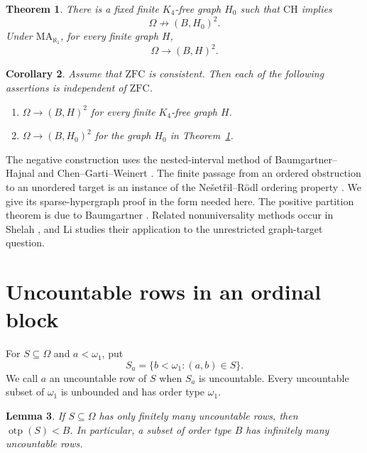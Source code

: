 \documentclass[10pt,letterpaper,leqno]{amsart}
\numberwithin{equation}{section}
\newtheorem{theorem}{Theorem}[section]
\newtheorem{lemma}[theorem]{Lemma}
\newtheorem{corollary}[theorem]{Corollary}
\theoremstyle{definition}
\theoremstyle{remark}
\newcommand{\MA}{\mathrm{MA}_{\aleph_1}}
\newcommand{\CH}{\mathrm{CH}}
\newcommand{\ZFC}{\mathrm{ZFC}}
\newcommand{\otp}{\operatorname{otp}}
\begin{document}
\begin{theorem}\label{thm:finite}
There is a fixed finite $K_4$-free graph $H_0$ such that $\CH$ implies
\begin{equation}\label{eq:negative}
 \Omega\not\to(B,H_0)^2.
\end{equation}
Under $\MA$, for every finite graph $H$,
\begin{equation}\label{eq:positive}
 \Omega\to(B,H)^2.
\end{equation}
\end{theorem}

\begin{corollary}\label{cor:independence}
Assume that $\ZFC$ is consistent. Then each of the following assertions is
independent of $\ZFC$.
\begin{enumerate}[label=\textup{(\roman*)},leftmargin=2.3em]
\item $\Omega\to(B,H)^2$ for every finite $K_4$-free graph $H$.
\item $\Omega\to(B,H_0)^2$ for the graph $H_0$ in Theorem~\ref{thm:finite}.
\end{enumerate}
\end{corollary}

The negative construction uses the nested-interval method of
Baumgartner--Hajnal \cite{BH} and Chen--Garti--Weinert \cite{CGW}.
The finite passage from an ordered obstruction to an unordered target is
an instance of the Ne\v{s}et\v{r}il--R\"odl ordering property \cite{NR}.
We give its sparse-hypergraph proof in the form needed here.
The positive partition theorem is due to Baumgartner \cite{Baumgartner}.
Related nonuniversality methods occur in Shelah \cite{Shelah}, and Li
\cite{Li} studies their application to the unrestricted graph-target
question.

\section{Uncountable rows in an ordinal block}

For $S\subseteq\Omega$ and $a<\omega_1$, put
\[
 S_a=\{b<\omega_1:(a,b)\in S\}.
\]
We call $a$ an uncountable row of $S$ when $S_a$ is uncountable. Every
uncountable subset of $\omega_1$ is unbounded and has order type $\omega_1$.

\begin{lemma}\label{lem:rows}
If $S\subseteq\Omega$ has only finitely many uncountable rows, then
$\otp(S)<B$. In particular, a subset of order type $B$ has infinitely
many uncountable rows.
\end{lemma}
\end{document}
